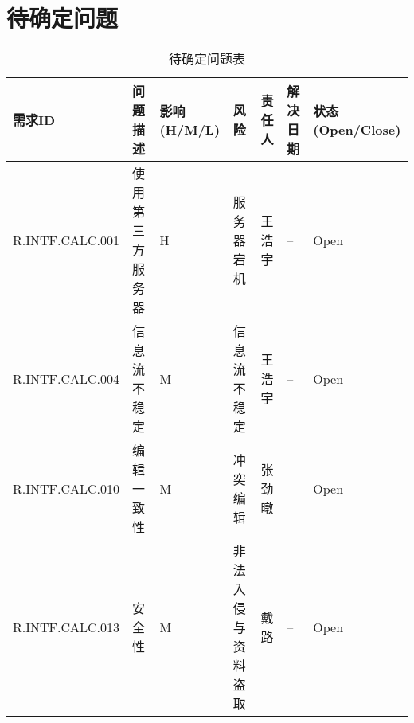 \chapter{待确定问题}
    \begin{table}[htbp]
        \centering
            \caption{待确定问题表} \label{tab:tbd_problems}
        \begin{tabular}{|p{8em}|p{5em}|p{3em}|p{5em}|p{3em}|p{2em}|p{5em}|}
                \hline
                需求ID & 问题描述 & 影响(H/M/L) & 风险 & 责任人 & 解决日期 & 状态(Open/Close) \\
                \hline
                R.INTF.CALC.001 & 使用第三方服务器 & H & 服务器宕机 & 王浩宇 & -- & Open\\
                \hline
                R.INTF.CALC.004 & 信息流不稳定 & M & 信息流不稳定 & 王浩宇 & -- & Open\\
                \hline
                R.INTF.CALC.010 & 编辑一致性 & M & 冲突编辑 & 张劲暾 & -- & Open\\
                \hline
                R.INTF.CALC.013 & 安全性 & M & 非法入侵与资料盗取 & 戴路 & -- & Open\\
                \hline
            \end{tabular}
    \end{table}
